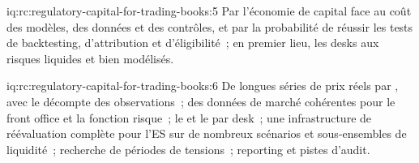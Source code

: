 \begin{solution}{iq:rc:regulatory-capital-for-trading-books:5}
Par l'économie de capital face au coût des modèles, des données et des contrôles, et par la probabilité de réussir
les tests de backtesting, d'attribution et d'éligibilité~; en premier lieu, les desks aux risques liquides et bien modélisés.
\end{solution}

\begin{solution}{iq:rc:regulatory-capital-for-trading-books:6}
De longues séries de prix réels par , avec le décompte des observations~; des données de marché cohérentes pour
le front office et la fonction risque~; le  et le  par desk~; une infrastructure de réévaluation complète pour l'ES sur de nombreux
scénarios et sous-ensembles de liquidité~; recherche de périodes de tensions~; reporting et pistes d'audit.
\end{solution}

